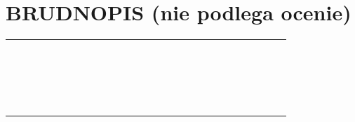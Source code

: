 \documentclass[10pt]{article}
\begin{document}
\section*{BRUDNOPIS (nie podlega ocenie)}
\begin{center}
\begin{tabular}{|c|c|c|c|c|c|c|c|c|c|c|c|c|c|c|c|c|c|c|c|c|c|c|c|c|}
\hline
 &  &  &  &  &  &  &  &  &  &  &  &  &  &  &  &  &  &  &  &  &  &  &  &  \\
\hline
 &  &  &  &  &  &  &  &  &  &  &  &  &  &  &  &  &  &  &  &  &  &  &  &  \\
\hline
 &  &  &  &  &  &  &  &  &  &  &  &  &  &  &  &  &  &  &  &  &  &  &  &  \\
\hline
 &  &  &  &  &  &  &  &  &  &  &  &  &  &  &  &  &  &  &  &  &  &  &  &  \\
\hline
 &  &  &  &  &  &  &  &  &  &  &  &  &  &  &  &  &  &  &  &  &  &  &  &  \\
\hline
 &  &  &  &  &  &  &  &  &  &  &  &  &  &  &  &  &  &  &  &  &  &  &  &  \\
\hline
 &  &  &  &  &  &  &  &  &  &  &  &  &  &  &  &  &  &  &  &  &  &  &  &  \\
\hline
 &  &  &  &  &  &  &  &  &  &  &  &  &  &  &  &  &  &  &  &  &  &  &  &  \\
\hline
 &  &  &  &  &  &  &  &  &  &  &  &  &  &  &  &  &  &  &  &  &  &  &  &  \\
\hline
 &  &  &  &  &  &  &  &  &  &  &  &  &  &  &  &  &  &  &  &  &  &  &  &  \\
\hline
 &  &  &  &  &  &  &  &  &  &  &  &  &  &  &  &  &  &  &  &  &  &  &  &  \\
\hline
 &  &  &  &  &  &  &  &  &  &  &  &  &  &  &  &  &  &  &  &  &  &  &  &  \\
\hline
 &  &  &  &  &  &  &  &  &  &  &  &  &  &  &  &  &  &  &  &  &  &  &  &  \\
\hline
 &  &  &  &  &  &  &  &  &  &  &  &  &  &  &  &  &  &  &  &  &  &  &  &  \\
\hline
 &  &  &  &  &  &  &  &  &  &  &  &  &  &  &  &  &  &  &  &  &  &  &  &  \\
\hline
 &  &  &  &  &  &  &  &  &  &  &  &  &  &  &  &  &  &  &  &  &  &  &  &  \\
\hline
 &  &  &  &  &  &  &  &  &  &  &  &  &  &  &  &  &  &  &  &  &  &  &  &  \\
\hline
 &  &  &  &  &  &  &  &  &  &  &  &  &  &  &  &  &  &  &  &  &  &  &  &  \\
\hline
 &  &  &  &  &  &  &  &  &  &  &  &  &  &  &  &  &  &  &  &  &  &  &  &  \\

\end{tabular}
\end{center}
\end{document}
